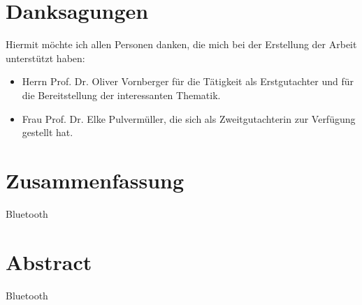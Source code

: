 \documentclass{AGTI}
\begin{document}
\standardTitelblatt
\cleardoublepage


\thispagestyle{empty}
\section*{Danksagungen}


Hiermit möchte ich allen Personen danken, die mich bei der Erstellung der Arbeit
unterstützt haben:

\begin{itemize}
  \item Herrn Prof. Dr. Oliver Vornberger für die Tätigkeit als Erstgutachter und für die Bereitstellung
    der interessanten Thematik.
  \item Frau Prof. Dr. Elke Pulvermüller, die sich als Zweitgutachterin zur Verfügung gestellt hat.
  
\end{itemize}

\cleardoublepage

\thispagestyle{empty}



\section*{Zusammenfassung}

Bluetooth

\vfill


\section*{Abstract}

Bluetooth


\cleardoublepage

%
\end{document}
